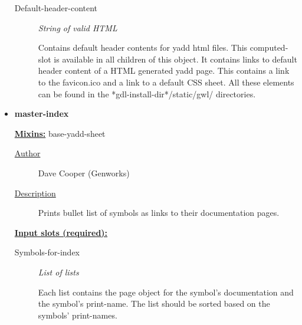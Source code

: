\documentclass [11pt]{book}
\begin{document}
\begin{itemize}
\begin{description}
\item [Default-header-content]
\emph{String of valid HTML}

 Contains default header contents for yadd
html files.  This computed-slot is available in all children of this
object. It contains links to default header content of a HTML
generated yadd page. This contains a link to the favicon.ico and a
link to a default CSS sheet. All these elements can be found in the
*gdl-install-dir*/static/gwl/ directories.




\end{description}







\item {}
\label{prim:master-index}
\textbf{master-index}


\textbf{
\underline{Mixins:}} base-yadd-sheet





\begin{description}

\item [
\underline{Author}]


Dave Cooper (Genworks)



\item [
\underline{Description}]


Prints bullet list of symbols as links to their documentation pages.



\end{description}








\textbf{
\underline{Input slots (required):}}

\begin{description}

\item [Symbols-for-index]
\emph{List of lists}

 Each list contains the page object for the symbol's
documentation and the symbol's print-name. The list should be sorted
based on the symbols' print-names.




\end{description}







\end{itemize}
\end{document}

